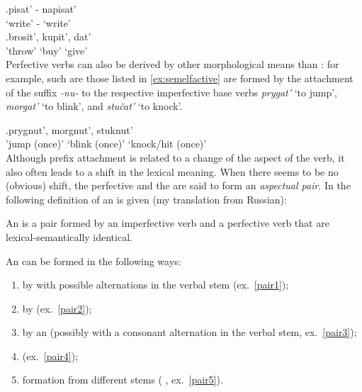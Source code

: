 \exg.\label{ex:asppair}pisat'\textsuperscript{\IPF} - napisat'\textsuperscript{\PF}\\
`write' - `write'\\

\exg.\label{ex:unprefperf}brosit'\textsuperscript{\PF}, kupit'\textsuperscript{\PF}, dat'\textsuperscript{\PF}\\
'throw' `buy' `give'\\

Perfective verbs can also be derived by other morphological means than : for example,   such are those listed in \ref{ex:semelfactive} are formed by the attachment of the suffix \textit{-nu-} to the respective imperfective base verbs \textit{prygat'} `to jump', \textit{morgat'} `to blink', and \textit{stu\v{c}at'} `to knock'.

\exg.\label{ex:semelfactive}prygnut'\textsuperscript{\PF}, morgnut'\textsuperscript{\PF}, stuknut'\textsuperscript{\PF}\\
{'jump (once)'} {`blink (once)'} {`knock/hit (once)'}\\

Although prefix attachment is related to a change of the aspect of the verb, it also often leads to a shift in the lexical meaning. When there seems to be no (obvious) shift, the perfective and the  are said to form an \textit{aspectual pair}. In \cite{Rosenthal:76} the following definition of an  is given (my translation from Russian):
\begin{definition}\label{def:pair}
An  is a pair formed by an imperfective verb and a perfective verb that are lexical-semantically identical.
\end{definition}
\noindent An  can be formed in the following ways:

\begin{enumerate}[noitemsep]
\item by  with possible alternations in the verbal stem (ex.~\ref{pair1});
\item by  (ex.~\ref{pair2});
\item by an  (possibly with a consonant alternation in the verbal stem, ex.~\ref{pair3});
\item {} (ex.~\ref{pair4});
\item formation from different stems ( , ex.~\ref{pair5}).
\end{enumerate}

